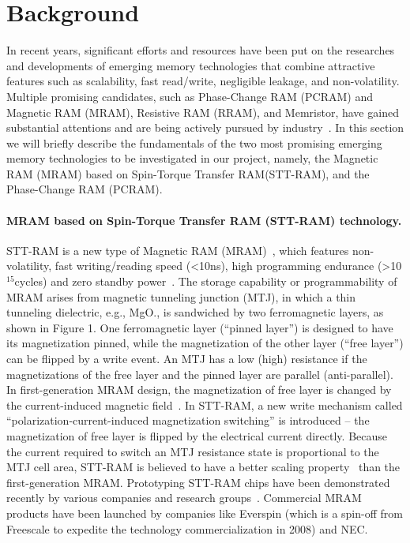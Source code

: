 \section{Background}

In recent years, significant efforts and resources have been put on
the researches and developments of emerging memory
technologies that combine attractive features
such as scalability, fast read/write, negligible
leakage, and non-volatility. Multiple promising candidates, such
as Phase-Change RAM (PCRAM) and Magnetic RAM (MRAM),
Resistive RAM (RRAM), and Memristor,
have gained substantial attentions and
are being actively pursued by industry~\cite{burr:scm08}. In this
section we will briefly describe the fundamentals of the two most promising
emerging memory technologies to be investigated in our project, namely, the Magnetic RAM (MRAM) based on Spin-Torque Transfer RAM(STT-RAM), and the Phase-Change RAM (PCRAM).

\paragraph{MRAM based on Spin-Torque Transfer RAM (STT-RAM) technology.}
STT-RAM is a new type of Magnetic RAM (MRAM)~\cite{ITRS07,Hosomi05,MRAM:TTO+06,MRAM:ZBM+06,mram:ibm:maffitt}, which
features non-volatility, fast writing/reading speed
(\textless 10ns), high programming endurance
(\textgreater 10$^{15}$cycles) and zero standby
power~\cite{ITRS07}. The storage capability or programmability of MRAM arises
from magnetic tunneling junction (MTJ), in which a thin tunneling dielectric, e.g., MgO., is sandwiched by
two ferromagnetic layers, as shown in Figure 1.
One ferromagnetic layer (``pinned layer'') is
designed to have its magnetization pinned, while the magnetization of the other layer (``free layer'')
can be flipped by a write event.
An MTJ has a low (high) resistance if the magnetizations of the free layer and the pinned layer are parallel (anti-parallel).
In first-generation MRAM design, the magnetization of free layer is changed by the
current-induced magnetic field~\cite{Motoyoshi04,Ha04}.
In STT-RAM, a new write mechanism called ``polarization-current-induced magnetization switching'' is introduced -- the magnetization of free layer is flipped by the electrical current directly.
Because the current required to switch an MTJ resistance state is
proportional to the MTJ cell area, STT-RAM is believed to have a better scaling property~\cite{Hosomi05,Kawahara07,MRAM:TTO+06}
than the first-generation MRAM.   Prototyping STT-RAM chips have been demonstrated recently by various companies and research groups~\cite{Hosomi05,Kawahara07, Nebashi09,Motoyoshi04,Andre05,Kawahara08}. Commercial MRAM products have been launched by companies like Everspin (which is a spin-off from Freescale to expedite the technology commercialization in 2008) and NEC.


